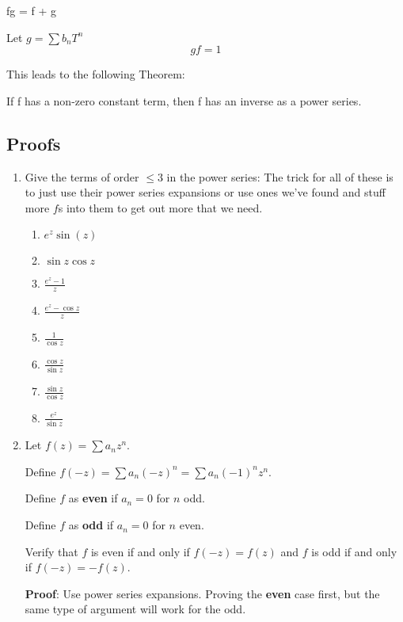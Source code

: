 \begin{thm}
  \; fg = \; f + \; g
\end{thm}

\begin{defn}
  Let $g = \sum b_n T^n$
  \[gf = 1\]
\end{defn}
This leads to the following Theorem:
\begin{thm}
  If f has a non-zero constant term, then f has an inverse as a power series.
\end{thm}

\subsection{Proofs}

\begin{enumerate}

  \item Give the terms of order $\leq 3$ in the power series:
  The trick for all of these is to just use their power series expansions or use ones we've found and stuff more $f$s into them 
  to get out more that we need.
  \begin{enumerate}
    \item $e^z \sin(z)$
    \item $\sin z \cos z$
    \item $\frac{e^z - 1}{z}$
    \item $\frac{e^z - \cos z}{z}$
    \item $\frac{1}{\cos z}$
    \item $\frac{\cos z}{\sin z}$
    \item $\frac{\sin z}{\cos z}$
    \item $\frac{e^z}{\sin z}$
  \end{enumerate}
  
  \item Let $f(z) = \sum a_n z^n$.

  Define $f(-z) = \sum a_n (-z)^n = \sum a_n(-1)^n z^n$.

  Define $f$ as \textbf{even} if $a_n = 0$ for $n$ odd.

  Define $f$ as \textbf{odd} if $a_n = 0$ for $n$ even.

  Verify that $f$ is even if and only if $f(-z) = f(z)$ and $f$ is odd if and only if $f(-z) = -f(z).$

  \textbf{Proof}:
  Use power series expansions. Proving the \textbf{even} case first, but the same type of argument will work for the odd.


\end{enumerate}
